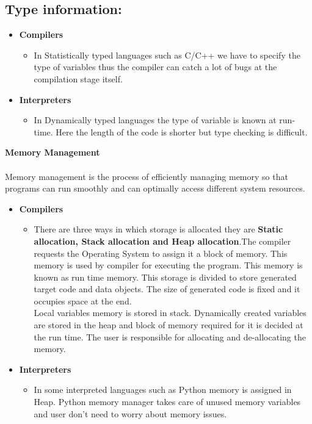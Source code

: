 \documentclass[english,a4paper,12pt]{article}
\begin{document}
\begin{enumerate}
 \subsection*{\textbf{Type information}:}
 \begin{itemize}
\item {{\textbf{Compilers }}}
    \begin{itemize}
        \item In Statistically typed languages such as C/C++ we have to specify the type of variables thus the compiler can catch a lot of bugs at the compilation stage itself.
    \end{itemize}
\item {\textbf{Interpreters}}
    \begin{itemize}
        \item In Dynamically typed languages the type of variable is known at run-time. Here the length of the code is shorter but type checking is difficult.
    \end{itemize}
\end{itemize}
{\large\textbf{Memory Management}}\\~\\
Memory management is the process of efficiently managing memory so that programs can run smoothly and can optimally access different system resources.
\begin{itemize}
\item {\textbf{Compilers}}
    \begin{itemize}
       \item There are three ways in which storage is allocated they are \textbf{Static allocation, Stack allocation and Heap allocation}.The compiler requests the Operating System to assign it a block of memory. This memory is used by compiler for executing the program. This memory is known as run time memory. This storage is divided to store generated target code and data objects. The size of generated code is fixed and it occupies space at the end. \\
      Local variables memory is stored in stack. Dynamically created variables are stored in the heap and block of memory required for it is decided at the run time. The user is responsible for allocating and de-allocating the memory.
    \end{itemize}
\item {\textbf{Interpreters}}
    \begin{itemize}
        \item In some interpreted languages such as Python memory is assigned in Heap. Python memory manager takes care of unused memory variables and user don't need to worry about memory issues.

\end{itemize}
\end{itemize}
\end{enumerate}
\end{document}
